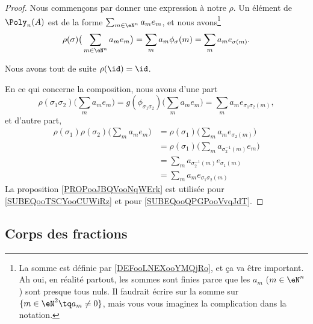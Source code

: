 \begin{proof}
	Nous commençons par donner une expression à notre \( \rho\). Un élément de \( \Poly_n(A)\) est de la forme \( \sum_{m\in \eN^n}a_me_m\), et nous avons\footnote{La somme est définie par \ref{DEFooLNEXooYMQjRo}, et ça va être important. Ah oui, en réalité partout, les sommes sont finies parce que les \( a_m\) (\( m\in \eN^n\)) sont presque tous nuls. Il faudrait écrire sur la somme sur \(\{ m\in \eN^2\tq a_m\neq 0 \}\), mais vous vous imaginez la complication dans la notation.}
	\begin{equation}
		\rho(\sigma)\big( \sum_{m\in \eN^n}a_me_m \big)=\sum_ma_m\phi_{\sigma}(m)=\sum_ma_me_{\sigma(m)}.
	\end{equation}

	Nous avons tout de suite \( \rho(\id)=\id\).

	En ce qui concerne la composition, nous avons d'une part
	\begin{equation}
		\rho(\sigma_1\sigma_2)\big( \sum_ma_me_m \big)=g(\phi_{\sigma_1\sigma_2})\big( \sum_ma_me_m \big)=\sum_ma_me_{\sigma_1\sigma_2(m)},
	\end{equation}
	et d'autre part,
	\begin{subequations}
		\begin{align}
			\rho(\sigma_1)\rho(\sigma_2)\big( \sum_ma_me_m \big) & =\rho(\sigma_1)\big( \sum_ma_me_{\sigma_2(m)} \big)                                    \\
			                                                     & =\rho(\sigma_1)\big( \sum_ma_{\sigma_2^{-1}(m)}e_m \big)   \label{SUBEQooTSCYooCUWiRz} \\
			                                                     & =\sum_ma_{\sigma_2^{-1}(m)}e_{\sigma_1(m)}                                             \\
			                                                     & =\sum_ma_me_{\sigma_1\sigma_2(m)}      \label{SUBEQooQPGPooVvqJdT}
		\end{align}
	\end{subequations}
	La proposition \ref{PROPooJBQVooNqWErk} est utilisée pour \eqref{SUBEQooTSCYooCUWiRz} et pour \eqref{SUBEQooQPGPooVvqJdT}.
\end{proof}


\subsection{Corps des fractions}

